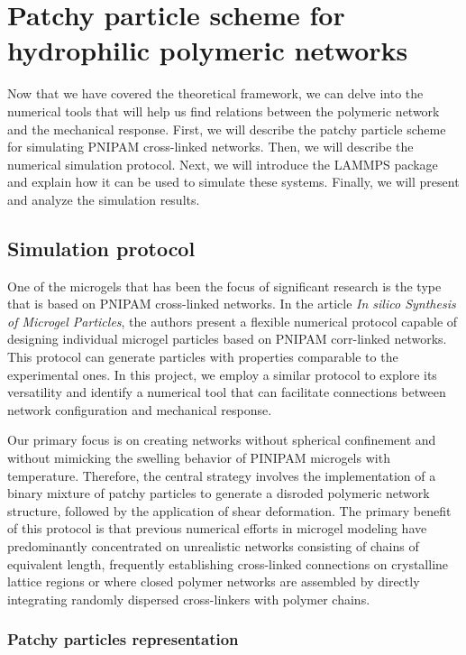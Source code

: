 \chapter{Patchy particle scheme for hydrophilic polymeric networks}

Now that we have covered the theoretical framework, we can delve into the numerical tools that will help us find relations between the polymeric network and the mechanical response.
First, we will describe the patchy particle scheme for simulating PNIPAM cross-linked networks.
Then, we will describe the numerical simulation protocol.
Next, we will introduce the LAMMPS package and explain how it can be used to simulate these systems.
Finally, we will present and analyze the simulation results.

\section{Simulation protocol}

One of the microgels that has been the focus of significant research is the type that is based on PNIPAM cross-linked networks.
In the article \textit{In silico Synthesis of Microgel Particles}, the authors present a flexible numerical protocol capable of designing individual microgel particles based on PNIPAM corr-linked networks. 
This protocol can generate particles with properties comparable to the experimental ones.
In this project, we employ a similar protocol to explore its versatility and identify a numerical tool that can facilitate connections between network configuration and mechanical response.

Our primary focus is on creating networks without spherical confinement and without mimicking the swelling behavior of PINIPAM microgels with temperature.
Therefore, the central strategy involves the implementation of a binary mixture of patchy particles to generate a disroded polymeric network structure, followed by the application of shear deformation.
The primary benefit of this protocol is that previous numerical efforts in microgel modeling have predominantly concentrated on unrealistic networks consisting of chains of equivalent length, frequently establishing cross-linked connections on crystalline lattice regions or where closed polymer networks are assembled by directly integrating randomly dispersed cross-linkers with polymer chains.

\subsection{Patchy particles representation}

